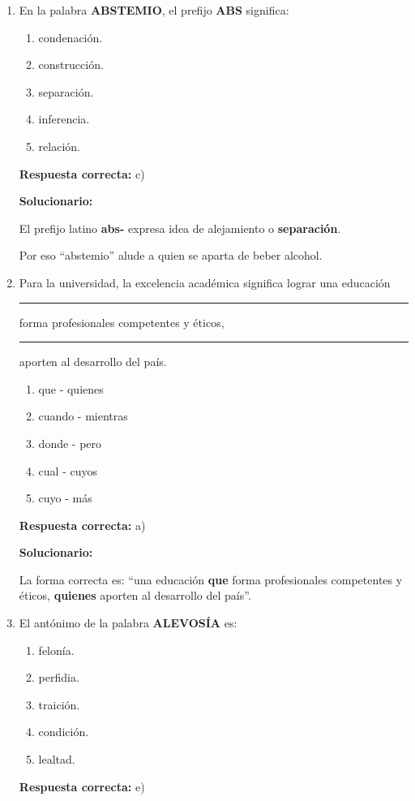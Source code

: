 \begin{enumerate}[resume]

	
	\item En la palabra \textbf{ABSTEMIO}, el prefijo \textbf{ABS} significa:
	\begin{enumerate}[label=\alph*)]
		\item condenación.
		\item construcción.
		\item separación.
		\item inferencia.
		\item relación.
	\end{enumerate}
	\textbf{Respuesta correcta:} c)
	
	\vspace{2mm}
	\textbf{Solucionario:}
	
	El prefijo latino \textbf{abs-} expresa idea de alejamiento o \textbf{separación}.
	
	Por eso ``abstemio'' alude a quien se aparta de beber alcohol.
	

	
	\vspace{6mm}
	
	\item Para la universidad, la excelencia académica significa lograr una educación \rule{1cm}{0.15mm} forma profesionales competentes y éticos, \rule{1cm}{0.15mm} aporten al desarrollo del país.
	\begin{enumerate}[label=\alph*)]
		\item que - quienes
		\item cuando - mientras
		\item donde - pero
		\item cual - cuyos
		\item cuyo - más
	\end{enumerate}
	\textbf{Respuesta correcta:} a)
	
	\vspace{2mm}
	\textbf{Solucionario:}
	
	La forma correcta es: ``una educación \textbf{que} forma profesionales competentes y éticos, \textbf{quienes} aporten al desarrollo del país''.
	

	
	\vspace{6mm}
	
	\item El antónimo de la palabra \textbf{ALEVOSÍA} es:
	\begin{enumerate}[label=\alph*)]
		\item felonía.
		\item perfidia.
		\item traición.
		\item condición.
		\item lealtad.
	\end{enumerate}
	\textbf{Respuesta correcta:} e)
	

\end{enumerate}
